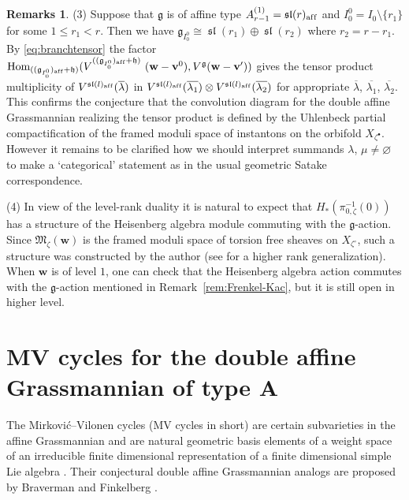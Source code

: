 \documentclass[pdftex]{sigma}
\theoremstyle{definition}
\newtheorem{Remarks}[equation]{Remarks}
\numberwithin{equation}{section}
\newcommand{\remref}[1]{Remark~\ref{#1}}
\newcommand{\algsl}{\operatorname{\mathfrak{sl}}} %
\newcommand{\g}{{\mathfrak g}}
\newcommand{\Hom}{\operatorname{Hom}}
\newcommand{\M}{{\mathfrak M}} %
\newcommand{\bv}{{\mathbf v}} %
\newcommand{\bw}{{\mathbf w}} %
\newcommand{\aff}{\mathrm{af\/f}}
\newcommand{\affLevi}{(\g_{I_0^0})_{\aff}}
\begin{document}
\begin{Remarks}
(3)
  Suppose that $\g$ is of af\/f\/ine type $A_{r-1}^{(1)} = \algsl(r)_\aff$
  and $I_0^0 = I_0 \setminus \{r_1\}$ for some $1 \le r_1 < r$. Then we
  have $\g_{I_0^0} \!\cong\! \algsl(r_1)\oplus \algsl(r_2)$ where $r_2 \!= \!r
 \! - \!r_1$. By \eqref{eq:branchtensor} the factor
\(
  \Hom_{(\affLevi{+}\mathfrak h)}
  (V^{(\affLevi{+}\mathfrak h)}$ $(\bw - \bv^0),
  V^\g(\bw-\bv'))
\)
gives the tensor product multiplicity of
$V^{\algsl(l)_\aff}(\overline{\lambda})$ in
$V^{\algsl(l)_\aff}(\overline{\lambda_1})\otimes
V^{\algsl(l)_\aff}(\overline{\lambda_2})$ for appropriate
$\overline{\lambda}$, $\overline{\lambda_1}$, $\overline{\lambda_2}$.
This conf\/irms the conjecture \cite{braverman-prep} that the
convolution diagram for the double af\/f\/ine Grassmannian realizing the
tensor product is def\/ined by the Uhlenbeck partial compactif\/ication of
the framed moduli space of instantons on the orbifold
$X_{\zeta^\bullet}$.
%
However it remains to be clarif\/ied how we should interpret summands
$\lambda$, $\mu\neq\varnothing$ to make a `categorical' statement as in
the usual geometric Satake correspondence.

(4) In view of the level-rank duality it is natural to expect that
$H_*(\pi_{0,\zeta}^{-1}(0))$ has a structure of the Heisenberg algebra
module commuting with the $\g$-action. Since $\M_\zeta(\bw)$ is the
framed moduli space of torsion free sheaves on $X_{\zeta^\circ}$, such
a structure was constructed by the author \cite[Chapter~8]{Lecture}
(see \cite{Baranovsky} for a higher rank generalization). When $\bw$
is of level $1$, one can check that the Heisenberg algebra action
commutes with the $\g$-action mentioned in \remref{rem:Frenkel-Kac},
but it is still open in higher level.
\end{Remarks}

\section[MV cycles for the double affine Grassmannian of type
  $A$]{MV cycles for the double af\/f\/ine Grassmannian of type
  $\boldsymbol{A}$}\label{sec:MV}

The Mirkovi\'c--Vilonen cycles (MV cycles in short) are certain
subvarieties in the af\/f\/ine Grassmannian and are natural geometric
basis elements of a weight space of an irreducible f\/inite dimensional
representation of a f\/inite dimensional simple Lie algebra \cite{MV}.
Their conjectural double af\/f\/ine Grassmannian analogs are proposed
by Braverman and Finkelberg \cite{braverman-prep}.
\end{document}
